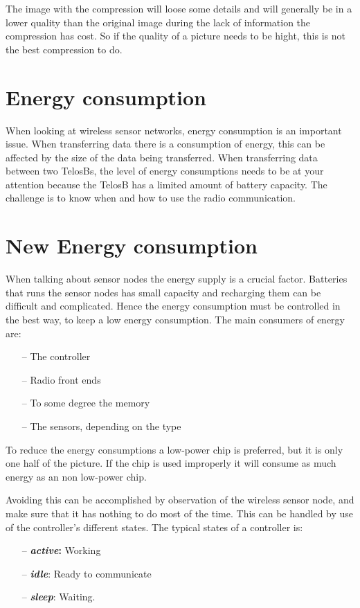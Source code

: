 The image with the compression will loose some details and will generally be in a lower quality than the original image during the lack of information the compression has cost. So if the quality of a picture needs to be hight, this is not the best compression to do.  

\section{Energy consumption}
When looking at wireless sensor networks, energy consumption is an important issue. When transferring data there is a consumption of energy, this can be affected by the size of the data being transferred. When transferring data between two TelosBs, the level of energy consumptions needs to be at your attention because the TelosB has a limited amount of battery capacity. The challenge is to know when and how to use the radio communication.

\section{New Energy consumption}
When talking about sensor nodes the energy supply is a crucial factor. Batteries that runs the sensor nodes has small capacity and recharging them can be difficult and complicated. Hence the energy consumption must be controlled in the best way, to keep a low energy consumption.
The main consumers of energy are:
\begin{itemize}
	\item[--] The controller
	\item[--] Radio front ends
	\item[--] To some degree the memory
	\item[--] The sensors, depending on the type
\end{itemize}
	 
To reduce the energy consumptions a low-power chip is preferred, but it is only one half of the picture. If the chip is used improperly it will consume as much energy as an non low-power chip.

Avoiding this can be accomplished by observation of the wireless sensor node, and make sure that it has nothing to do most of the time. This can be handled by use of the controller's different states. The typical states of a controller is:
\begin{itemize}
	\item[--] \textbf{\emph{active}:} Working 
	\item[--] \textbf{\emph{idle}}: Ready to communicate 
	\item[--] \textbf{\emph{sleep}}: Waiting.
\end{itemize}

